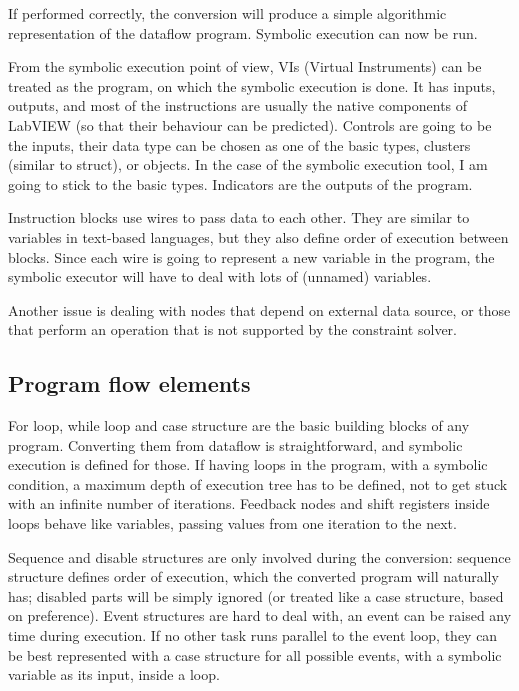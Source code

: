 If performed correctly, the conversion will produce a simple algorithmic representation of the dataflow program. Symbolic execution can now be run.

From the symbolic execution point of view, VIs (Virtual Instruments) can be treated as the program, on which the symbolic execution is done. It has inputs, outputs, and most of the instructions are usually the native components of LabVIEW (so that their behaviour can be predicted). Controls are going to be the inputs, their data type can be chosen as one of the basic types, clusters (similar to struct), or objects. In the case of the symbolic execution tool, I am going to stick to the basic types. Indicators are the outputs of the program.

Instruction blocks use wires to pass data to each other. They are similar to variables in text-based languages, but they also define order of execution between blocks. Since each wire is going to represent a new variable in the program, the symbolic executor will have to deal with lots of (unnamed) variables.

Another issue is dealing with nodes that depend on external data source, or those that perform an operation that is not supported by the constraint solver.

\subsection{Program flow elements}
For loop, while loop and case structure are the basic building blocks of any program. Converting them from dataflow is straightforward, and symbolic execution is defined for those. If having loops in the program, with a symbolic condition, a maximum depth of execution tree has to be defined, not to get stuck with an infinite number of iterations. Feedback nodes and shift registers inside loops behave like variables, passing values from one iteration to the next.

Sequence and disable structures are only involved during the conversion: sequence structure defines order of execution, which the converted program will naturally has; disabled parts will be simply ignored (or treated like a case structure, based on preference). Event structures are hard to deal with, an event can be raised any time during execution. If no other task runs parallel to the event loop, they can be best represented with a case structure for all possible events, with a symbolic variable as its input, inside a loop.


